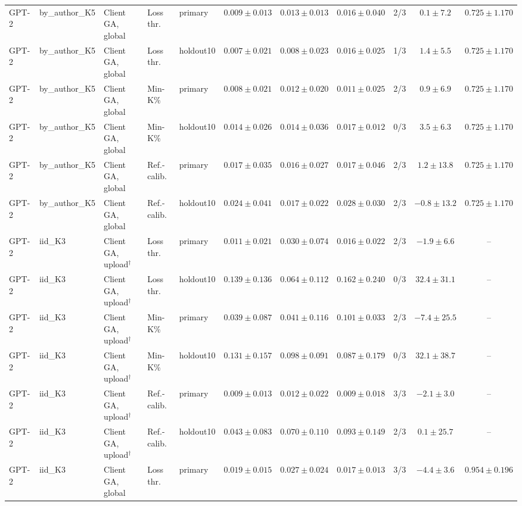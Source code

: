 {\begin{longtable}{@{\extracolsep{\fill}}lllllcccccc@{}}
GPT-2 & by\_author\_K5 & Client GA, global & Loss thr. & primary & $0.009 \pm 0.013$ & $0.013 \pm 0.013$ & $0.016 \pm 0.040$ & 2/3 & $0.1 \pm 7.2$ & $0.725 \pm 1.170$ \\
GPT-2 & by\_author\_K5 & Client GA, global & Loss thr. & holdout10 & $0.007 \pm 0.021$ & $0.008 \pm 0.023$ & $0.016 \pm 0.025$ & 1/3 & $1.4 \pm 5.5$ & $0.725 \pm 1.170$ \\
GPT-2 & by\_author\_K5 & Client GA, global & Min-K\% & primary & $0.008 \pm 0.021$ & $0.012 \pm 0.020$ & $0.011 \pm 0.025$ & 2/3 & $0.9 \pm 6.9$ & $0.725 \pm 1.170$ \\
GPT-2 & by\_author\_K5 & Client GA, global & Min-K\% & holdout10 & $0.014 \pm 0.026$ & $0.014 \pm 0.036$ & $0.017 \pm 0.012$ & 0/3 & $3.5 \pm 6.3$ & $0.725 \pm 1.170$ \\
GPT-2 & by\_author\_K5 & Client GA, global & Ref.-calib. & primary & $0.017 \pm 0.035$ & $0.016 \pm 0.027$ & $0.017 \pm 0.046$ & 2/3 & $1.2 \pm 13.8$ & $0.725 \pm 1.170$ \\
GPT-2 & by\_author\_K5 & Client GA, global & Ref.-calib. & holdout10 & $0.024 \pm 0.041$ & $0.017 \pm 0.022$ & $0.028 \pm 0.030$ & 2/3 & $-0.8 \pm 13.2$ & $0.725 \pm 1.170$ \\
GPT-2 & iid\_K3 & Client GA, upload$^{\dagger}$ & Loss thr. & primary & $0.011 \pm 0.021$ & $0.030 \pm 0.074$ & $0.016 \pm 0.022$ & 2/3 & $-1.9 \pm 6.6$ & -- \\
GPT-2 & iid\_K3 & Client GA, upload$^{\dagger}$ & Loss thr. & holdout10 & $0.139 \pm 0.136$ & $0.064 \pm 0.112$ & $0.162 \pm 0.240$ & 0/3 & $32.4 \pm 31.1$ & -- \\
GPT-2 & iid\_K3 & Client GA, upload$^{\dagger}$ & Min-K\% & primary & $0.039 \pm 0.087$ & $0.041 \pm 0.116$ & $0.101 \pm 0.033$ & 2/3 & $-7.4 \pm 25.5$ & -- \\
GPT-2 & iid\_K3 & Client GA, upload$^{\dagger}$ & Min-K\% & holdout10 & $0.131 \pm 0.157$ & $0.098 \pm 0.091$ & $0.087 \pm 0.179$ & 0/3 & $32.1 \pm 38.7$ & -- \\
GPT-2 & iid\_K3 & Client GA, upload$^{\dagger}$ & Ref.-calib. & primary & $0.009 \pm 0.013$ & $0.012 \pm 0.022$ & $0.009 \pm 0.018$ & 3/3 & $-2.1 \pm 3.0$ & -- \\
GPT-2 & iid\_K3 & Client GA, upload$^{\dagger}$ & Ref.-calib. & holdout10 & $0.043 \pm 0.083$ & $0.070 \pm 0.110$ & $0.093 \pm 0.149$ & 2/3 & $0.1 \pm 25.7$ & -- \\
GPT-2 & iid\_K3 & Client GA, global & Loss thr. & primary & $0.019 \pm 0.015$ & $0.027 \pm 0.024$ & $0.017 \pm 0.013$ & 3/3 & $-4.4 \pm 3.6$ & $0.954 \pm 0.196$ \\

\end{longtable}}
